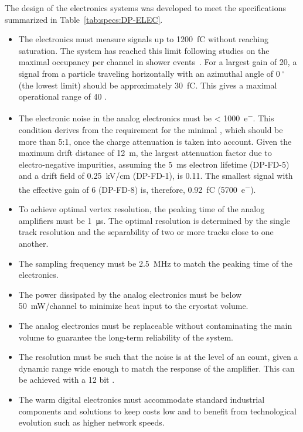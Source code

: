 The design of the electronics systems was developed to meet the specifications summarized in Table~\ref{tab:specs:DP-ELEC}.



\begin{itemize}

\item{The  electronics must measure signals up to \SI{1200}{\femto\coulomb} without reaching saturation. The system has reached this limit following  studies on the maximal occupancy per channel in shower events~\cite{WA105-TDR}. For a largest  gain of \num{20}, a  signal from a particle traveling horizontally with an azimuthal angle of $\SI{0}{^\circ}$ (the lowest limit) should be approximately \SI{30}{fC}. This gives a maximal operational range of \num{40} .}

\item{The electronic noise in the  analog electronics must be \SI{< 1000}{e^{-}}. This condition derives from the requirement for the minimal , which should be more than \num{5}:\num{1}, once the charge attenuation is taken into account. Given the maximum drift distance of \SI{12}{\meter}, the largest attenuation factor due to electro-negative impurities, assuming the \SI{5}{\milli\second} electron lifetime (DP-FD-5) and a drift field of \SI{0.25}{\kilo\volt/\cm} (DP-FD-1), is \num{0.11}. The smallest  signal with the  effective gain of \num{6} (DP-FD-8) is, therefore, \SI{0.92}{\femto\coulomb} (\SI{5700}{e^{-}}).}

\item{To achieve optimal vertex resolution, the peaking time of the  analog amplifiers must be \SI{1}{\micro\second}. The optimal resolution is determined by the single track resolution and the separability of two or more tracks close to one another.}

\item{The sampling frequency must be \SI{2.5}{\MHz} to match the peaking time of the  electronics.}

\item{The power dissipated by the  analog electronics must be below \SI{50}{\milli\watt/channel} to minimize heat input to the cryostat volume.}

\item{The  analog electronics must be replaceable without contaminating the main  volume to guarantee the long-term reliability of the system.}

\item{The  resolution must be such that the noise is at the level of an  count, given a dynamic range wide enough to match the response of the  amplifier. This can be achieved with a \num{12} bit .} 

\item{%
The warm digital electronics must accommodate standard industrial components and solutions to keep costs low and to benefit from technological evolution such as higher network speeds.}
\end{itemize}
